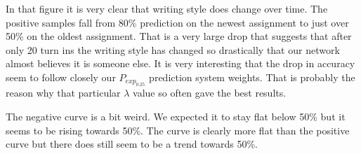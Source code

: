 In that figure it is very clear that writing style does change over time. The
positive samples fall from 80\% prediction on the newest assignment to just
over 50\% on the oldest assignment. That is a very large drop that suggests
that after only 20 turn ins the writing style has changed so drastically that
our network almost believes it is someone else. It is very interesting that the
drop in accuracy seem to follow closely our $P_{exp_{0.25}}$ prediction system
weights. That is probably the reason why that particular $\lambda$ value so
often gave the best results.

The negative curve is a bit weird. We expected it to stay flat below 50\% but
it seems to be rising towards 50\%. The curve is clearly more flat than the
positive curve but there does still seem to be a trend towards 50\%.
